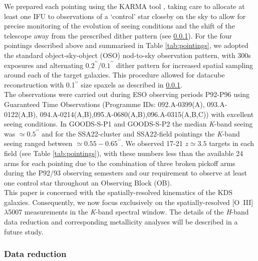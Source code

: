 \documentclass[fleqn,usenatbib]{mnras}
\begin{document}
We prepared each pointing using the KARMA tool \citep{Wegner2008}, taking care to allocate at least one IFU to observations of a `control' star closeby on the sky to allow for precise monitoring of the evolution of seeing conditions and the shift of the telescope away from the prescribed dither pattern (see \cref{subsubsec:datareduction}).
For the four pointings described above and summarised in Table \ref{tab:pointings}, we adopted the standard object-sky-object (OSO) nod-to-sky observation pattern, with 300s exposures and alternating $0.2^{\prime\prime}$/$0.1^{\prime\prime}$ dither pattern for increased spatial sampling around each of the target galaxies.
This procedure allowed for datacube reconstruction with 0.1$^{\prime\prime}$ size spaxels as described in \cref{subsubsec:datareduction}. \\


The observations were carried out during ESO observing periods P92-P96 using Guaranteed Time Observations (Programme IDs: 092.A-0399(A), 093.A-0122(A,B), 094.A-0214(A,B),095.A-0680(A,B),096.A-0315(A,B,C)) with excellent seeing conditions.
In GOODS-S-P1 and GOODS-S-P2 the median {\it K}-band seeing was $\simeq0.5^{\prime\prime}$ and for the SSA22-cluster and SSA22-field pointings the {\it K}-band seeing ranged between $\simeq0.55-0.65^{\prime\prime}$.
We observed 17-21 $z\simeq3.5$ targets in each field (see Table \ref{tab:pointings}), with these numbers less than the available 24 arms for each pointing due to the combination of three broken pickoff arms during the P92/93 observing semesters and our requirement to observe at least one control star throughout an Observing Block (OB). \\


This paper is concerned with the spatially-resolved kinematics of the KDS galaxies.
Consequently, we now focus exclusively on the spatially-resolved [O~{\sc III}]$\lambda$5007 measurements in the {\it K}-band spectral window. 
The details of the {\it H}-band data reduction and corresponding metallicity analyses will be described in a future study.

\subsubsection{Data reduction}\label{subsubsec:datareduction}
\end{document}

